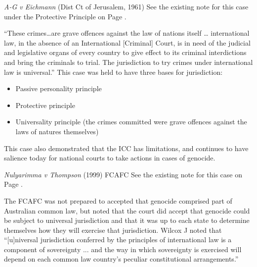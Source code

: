 \begin{casedetails}{\textit{A-G v Eichmann} (Dist Ct of Jerusalem, 1961)}
    \flushleft
    See the existing note for this case under the Protective Principle on Page \pageref{case:Eichmann (protective principle)}.

    \vspace{\baselineskip}

    ``These crimes…are grave offences against the law of nations itself … international law, in the absence of an International [Criminal] Court, is in need of the judicial and legislative organs of every country to give effect to its criminal interdictions and bring the criminals to trial. The jurisdiction to try crimes under international law is universal.'' This case was held to have three bases for jurisdiction:
    \begin{itemize}
        \item Passive personality principle
        \item Protective principle
        \item Universality principle (the crimes committed were grave offences against the laws of natures themselves)
    \end{itemize}
    This case also demonstrated that the ICC has limitations, and continues to have salience today for national courts to take actions in cases of genocide.
\end{casedetails}

\begin{casedetails}{\textit{Nulyarimma v Thompson} (1999) FCAFC}
    \flushleft
    See the existing note for this case on Page \pageref{case: Nulyarimanna v Thompson}.

    \vspace{\baselineskip}

    The FCAFC was not prepared to accepted that genocide comprised part of Australian common law, but noted that the court did accept that genocide could be subject to universal jurisdiction and that it was up to each state to determine themselves how they will exercise that jurisdiction. Wilcox J noted that ``[u]niversal jurisdiction conferred by the principles of international law is a component of sovereignty ... and the way in which sovereignty is exercised will depend on each common law country's peculiar constitutional arrangements.''
\end{casedetails}

